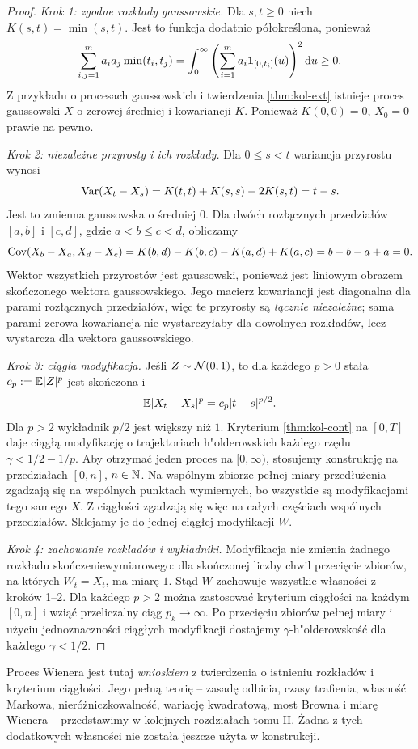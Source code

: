 \begin{proof}
\emph{Krok 1: zgodne rozkłady gaussowskie.}
Dla $s,t\ge0$ niech $K(s,t)=\min(s,t)$.
Jest to funkcja dodatnio półokreślona, ponieważ
\[
\sum_{i,j=1}^m a_ia_j\min(t_i,t_j)
=\int_0^\infty
\left(\sum_{i=1}^m a_i\mathbf{1}_{[0,t_i]}(u)\right)^2\mathrm{d} u\ge0.
\]
Z przykładu o procesach gaussowskich i twierdzenia
\ref{thm:kol-ext} istnieje proces gaussowski $X$
o zerowej średniej i kowariancji $K$.
Ponieważ $K(0,0)=0$, $X_0=0$ prawie na pewno.

\emph{Krok 2: niezależne przyrosty i ich rozkłady.}
Dla $0\le s<t$ wariancja przyrostu wynosi
\[
\operatorname{Var}(X_t-X_s)=K(t,t)+K(s,s)-2K(s,t)=t-s.
\]
Jest to zmienna gaussowska o średniej $0$.
Dla dwóch rozłącznych przedziałów $[a,b]$ i $[c,d]$,
gdzie $a<b\le c<d$, obliczamy
\[
\operatorname{Cov}(X_b-X_a,X_d-X_c)
=K(b,d)-K(b,c)-K(a,d)+K(a,c)
=b-b-a+a=0.
\]
Wektor wszystkich przyrostów jest gaussowski, ponieważ
jest liniowym obrazem skończonego wektora gaussowskiego.
Jego macierz kowariancji jest diagonalna dla
parami rozłącznych przedziałów, więc te przyrosty są
\emph{łącznie niezależne}; sama parami zerowa kowariancja
nie wystarczyłaby dla dowolnych rozkładów, lecz wystarcza
dla wektora gaussowskiego.

\emph{Krok 3: ciągła modyfikacja.}
Jeśli $Z\sim\mathcal{N}(0,1)$, to dla każdego $p>0$
stała $c_p:=\mathbb{E}|Z|^p$ jest skończona i
\[
\mathbb{E}|X_t-X_s|^p=c_p|t-s|^{p/2}.
\]
Dla $p>2$ wykładnik $p/2$ jest większy niż $1$.
Kryterium \ref{thm:kol-cont} na $[0,T]$ daje
ciągłą modyfikację o trajektoriach h"olderowskich
każdego rzędu $\gamma<1/2-1/p$.
Aby otrzymać jeden proces na $[0,\infty)$, stosujemy
konstrukcję na przedziałach $[0,n]$, $n\in\mathbb{N}$.
Na wspólnym zbiorze pełnej miary przedłużenia
zgadzają się na wspólnych punktach wymiernych,
bo wszystkie są modyfikacjami tego samego $X$.
Z ciągłości zgadzają się więc na całych częściach wspólnych
przedziałów. Sklejamy je do jednej ciągłej modyfikacji $W$.

\emph{Krok 4: zachowanie rozkładów i wykładniki.}
Modyfikacja nie zmienia żadnego rozkładu
skończeniewymiarowego: dla skończonej liczby chwil
przecięcie zbiorów, na których $W_t=X_t$, ma miarę $1$.
Stąd $W$ zachowuje wszystkie własności z kroków 1--2.
Dla każdego $p>2$ można zastosować kryterium ciągłości
na każdym $[0,n]$ i wziąć przeliczalny ciąg
$p_k\to\infty$. Po przecięciu zbiorów pełnej miary
i użyciu jednoznaczności ciągłych modyfikacji dostajemy
$\gamma$-h"olderowskość dla każdego $\gamma<1/2$.
\end{proof}

\begin{uwaga}
Proces Wienera jest tutaj \emph{wnioskiem} z twierdzenia
o istnieniu rozkładów i kryterium ciągłości.
Jego pełną teorię -- zasadę odbicia, czasy trafienia,
własność Markowa, nieróżniczkowalność, wariację
kwadratową, most Browna i miarę Wienera --
przedstawimy w kolejnych rozdziałach tomu II.
Żadna z tych dodatkowych własności nie została
jeszcze użyta w konstrukcji.
\end{uwaga}

